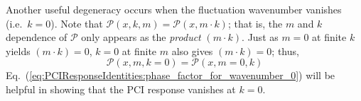 Another useful degeneracy occurs
when the fluctuation wavenumber vanishes (i.e.\ $k = 0$).
Note that $\mathcal{P}(x, k, m) = \mathcal{P}(x, m \cdot k)$;
that is, the $m$ and $k$ dependence of $\mathcal{P}$
only appears as the \emph{product} $(m \cdot k)$.
Just as $m = 0$ at finite $k$ yields $(m \cdot k) = 0$,
$k = 0$ at finite $m$ also gives $(m \cdot k) = 0$;
thus,
\begin{equation}
  \mathcal{P}(x, m, k=0) = \mathcal{P}(x, m=0, k)
  \label{eq:PCIResponseIdentities:phase_factor_for_wavenumber_0}
\end{equation}
Eq.~(\ref{eq:PCIResponseIdentities:phase_factor_for_wavenumber_0})
will be helpful in showing that the PCI response vanishes at $k = 0$.
